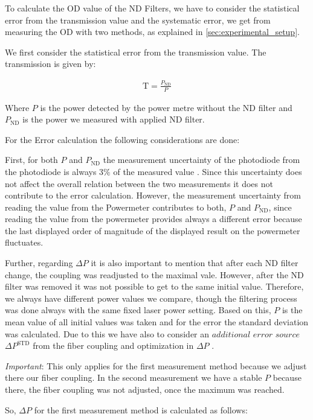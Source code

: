To calculate the OD value of the ND Filters, we have to consider the statistical error from the
transmission value and the systematic error, we get from measuring the OD with two methods, as explained in \ref{sec:experimental_setup}.

We first consider the statistical error from the transmission value.
The transmission is given by:

\begin{align}
    \text{T}=\frac{P_{\text{ND}}}{P}
\end{align}

Where $P$ is the power detected by the power metre without the ND filter and $P_{\text{ND}}$
is the power we measured with applied ND filter.

For the Error calculation the following considerations are done: 

First, for both $P$ and $P_{\text{ND}}$ the measurement uncertainty of the photodiode from the photodiode is always 3$\%$
of the measured value \cite{unknown-author-no-date}.
Since this uncertainty does not affect the overall relation between the two measurements it does not
contribute to the error calculation.
However, the measurement uncertainty from reading the value from the Powermeter contributes to both,
$P$ and $P_{\text{ND}}$, since reading the value from the powermeter provides always a different error because
the last displayed order of magnitude of the displayed result on the powermeter fluctuates.

Further, regarding  $\Delta P$ it is also important to mention that after each ND filter change,
the coupling was readjusted to the maximal vale.
However, after the ND filter was removed it was not possible to get to the same initial value.
Therefore, we always have different power values we compare, though the filtering process was done always with the same
fixed laser power setting.
Based on this, $P$ is the mean value of all initial values was taken and for the error the standard
deviation was calculated.
Due to this we have also to consider an $\textit{additional error source} $ $\Delta P^{\text{STD}}$ from the fiber
coupling and optimization in $\Delta P$ .

\textit{Important}: This only applies for the first measurement method because we adjust there our fiber coupling.
In the second measurement we have a stable $P$ because there, the fiber coupling was not adjusted, once the maximum was
reached.

So, $\Delta P$ for the first measurement method is calculated as follows:

